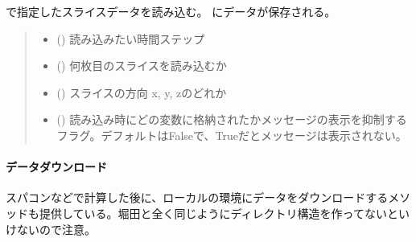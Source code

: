 \documentclass[letterpaper,10pt,dvipdfmx,report]{sphinxmanual}
\begin{document}
\begin{fulllineitems}
\label{\detokenize{io:R2D2.R2D2_data.read_qq_slice}}
\pysigstartsignatures
{}
\pysigstopsignatures
\sphinxAtStartPar
{} で指定したスライスデータを読み込む。{\hyperref[\detokenize{io:R2D2.R2D2_data.ql}]{}} にデータが保存される。
\begin{quote}\begin{description}
\begin{itemize}
\item {} 
\sphinxAtStartPar
{} () \sphinxhyphen{}\sphinxhyphen{} 読み込みたい時間ステップ

\item {} 
\sphinxAtStartPar
{} () \sphinxhyphen{}\sphinxhyphen{} 何枚目のスライスを読み込むか

\item {} 
\sphinxAtStartPar
{} () \sphinxhyphen{}\sphinxhyphen{} スライスの方向 \textquotesingle{}x\textquotesingle{}, \textquotesingle{}y\textquotesingle{}, \textquotesingle{}z\textquotesingle{}のどれか

\item {} 
\sphinxAtStartPar
{} () \sphinxhyphen{}\sphinxhyphen{} 読み込み時にどの変数に格納されたかメッセージの表示を抑制するフラグ。デフォルトはFalseで、Trueだとメッセージは表示されない。

\end{itemize}

\end{description}\end{quote}

\end{fulllineitems}



\paragraph{データダウンロード}
\label{\detokenize{io:id6}}
\sphinxAtStartPar
スパコンなどで計算した後に、ローカルの環境にデータをダウンロードするメソッドも提供している。堀田と全く同じようにディレクトリ構造を作ってないといけないので注意。
\end{document}
